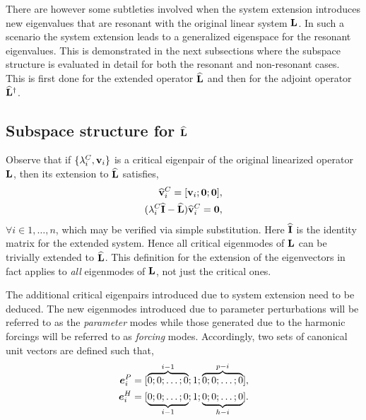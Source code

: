There are however some subtleties involved when the system extension introduces new eigenvalues that are resonant with the original linear system $\mathbf{L}$. In such a scenario the system extension leads to a generalized eigenspace for the resonant eigenvalues. This is demonstrated in the next subsections where the subspace structure is evaluated in detail for both the resonant and non-resonant cases. This is first done for the extended operator $\mathbf{\widehat{L}}$ and then for the adjoint operator $\mathbf{\widehat{L}}^{\dagger}$. 

\subsection{Subspace structure for $\mathbf{\widehat{L}}$}

Observe that if $\{\lambda^{C}_{i}, \mathbf{v}_{i}\}$ is a critical eigenpair of the original linearized operator $\mathbf{L}$, then its extension to $\mathbf{\widehat{L}}$ satisfies,
\begin{subequations}
	\begin{align}
		\widehat{\mathbf{v}}^{C}_{i} = [\mathbf{v}_{i}; \mathbf{0}; \mathbf{0}], \\
		(\lambda^{C}_{i}\mathbf{\widehat{I}} - \mathbf{\widehat{L}})\widehat{\mathbf{v}}^{C}_{i} = \mathbf{0}, 
	\end{align}
\end{subequations}
$\forall i\in 1,\ldots,n$, which may be verified via simple substitution. Here $\mathbf{\widehat{I}}$ is the identity matrix for the extended system. Hence all critical eigenmodes of $\mathbf{L}$ can be trivially extended to $\mathbf{\widehat{L}}$. This definition for the extension of the eigenvectors in fact applies to \emph{all} eigenmodes of $\mathbf{L}$, not just the critical ones. 

The additional critical eigenpairs introduced due to system extension need to be deduced. The new eigenmodes introduced due to parameter perturbations will be referred to as the \emph{parameter} modes while those generated due to the harmonic forcings will be referred to as \emph{forcing} modes. Accordingly, two sets of canonical unit vectors are defined such that,
\begin{subequations}
	\begin{align}
		\label{eqn:zeta_i_l}
		\boldsymbol{e}^{P}_{i} = [\overbrace{0;0;\ldots;0}^{i-1};1;\overbrace{0;0;\ldots;0}^{p-i}], \\
		\boldsymbol{e}^{H}_{i} = [\underbrace{0;0;\ldots;0}_{i-1};1;\underbrace{0;0;\ldots;0}_{h-i}].
	\end{align}
\end{subequations}

